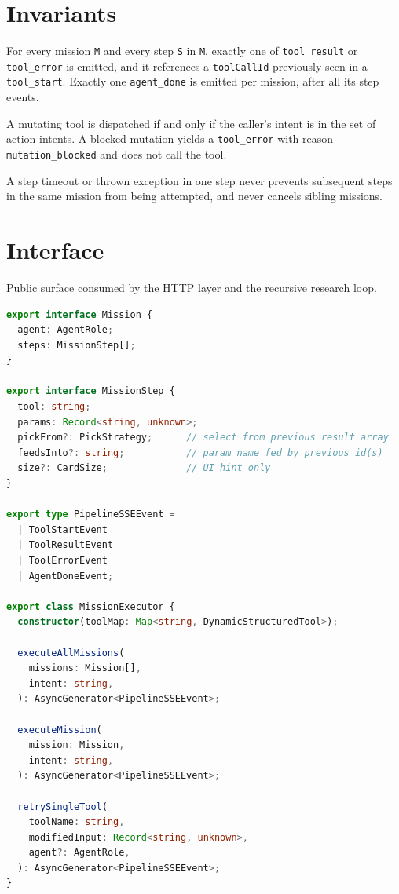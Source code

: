 \section{Invariants}
\begin{invariant}
For every mission \texttt{M} and every step \texttt{S} in \texttt{M}, exactly one of \texttt{tool\_result} or \texttt{tool\_error} is emitted, and it references a \texttt{toolCallId} previously seen in a \texttt{tool\_start}. Exactly one \texttt{agent\_done} is emitted per mission, after all its step events.
\end{invariant}

\begin{invariant}
A mutating tool is dispatched if and only if the caller's intent is in the set of action intents. A blocked mutation yields a \texttt{tool\_error} with reason \texttt{mutation\_blocked} and does not call the tool.
\end{invariant}

\begin{invariant}
A step timeout or thrown exception in one step never prevents subsequent steps in the same mission from being attempted, and never cancels sibling missions.
\end{invariant}

\section{Interface}
Public surface consumed by the HTTP layer and the recursive research loop.

\begin{lstlisting}[language=TypeScript]
export interface Mission {
  agent: AgentRole;
  steps: MissionStep[];
}

export interface MissionStep {
  tool: string;
  params: Record<string, unknown>;
  pickFrom?: PickStrategy;      // select from previous result array
  feedsInto?: string;           // param name fed by previous id(s)
  size?: CardSize;              // UI hint only
}

export type PipelineSSEEvent =
  | ToolStartEvent
  | ToolResultEvent
  | ToolErrorEvent
  | AgentDoneEvent;

export class MissionExecutor {
  constructor(toolMap: Map<string, DynamicStructuredTool>);

  executeAllMissions(
    missions: Mission[],
    intent: string,
  ): AsyncGenerator<PipelineSSEEvent>;

  executeMission(
    mission: Mission,
    intent: string,
  ): AsyncGenerator<PipelineSSEEvent>;

  retrySingleTool(
    toolName: string,
    modifiedInput: Record<string, unknown>,
    agent?: AgentRole,
  ): AsyncGenerator<PipelineSSEEvent>;
}
\end{lstlisting}

